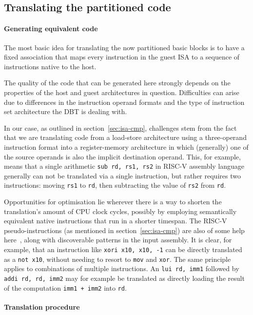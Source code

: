 \subsection{Translating the partitioned code}
\paragraph{Generating equivalent code}
The most basic idea for translating the now partitioned basic blocks is to have a fixed association that maps every instruction in the guest ISA to a sequence of instructions native to the host.

The quality of the code that can be generated here strongly depends on the properties of the host and guest architectures in question.
Difficulties can arise due to differences in the instruction operand formats and the type of instruction set architecture the DBT is dealing with.

In our case, as outlined in section~\ref{sec:isa-cmp}, challenges stem from the fact that we are translating code from a load-store architecture using a three-operand instruction format into a register-memory architecture in which (generally) one of the source operands is also the implicit destination operand.
This, for example, means that a single arithmetic \texttt{sub~rd,~rs1,~rs2} in RISC-V assembly language generally can not be translated via a single instruction, but rather requires two instructions: moving \texttt{rs1} to \texttt{rd}, then subtracting the value of \texttt{rs2} from \texttt{rd}.

Opportunities for optimisation lie wherever there is a way to shorten the translation's amount of CPU clock cycles, possibly by employing semantically equivalent native instructions that run in a shorter timespan.
The RISC-V pseudo-instructions (as mentioned in section~\ref{sec:isa-cmp}) are also of some help here~\cite[S. 139]{riscvspec}, along with discoverable patterns in the input assembly.
It is clear, for example, that an instruction like \texttt{xori~x10,~x10,~-1} can be directly translated as a \texttt{not x10}, without needing to resort to \texttt{mov} and \texttt{xor}.
The same principle applies to combinations of multiple instructions.
An \texttt{lui~rd,~imm1} followed by \texttt{addi~rd,~rd,~imm2} may for example be translated as directly loading the result of the computation \texttt{imm1~+~imm2} into \texttt{rd}.

\paragraph{Translation procedure}

